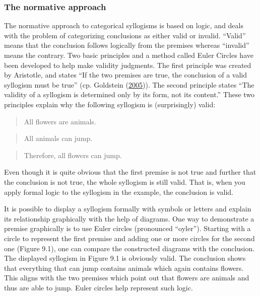\documentclass[
]{krantz}
\begin{document}
\hypertarget{the-normative-approach}{%
\subsubsection*{The normative approach}\label{the-normative-approach}}


The normative approach to categorical syllogisms is based on logic, and deals with the problem of categorizing conclusions as either valid or invalid. ``Valid'' means that the conclusion follows logically from the premises whereas ``invalid'' means the contrary. Two basic principles and a method called Euler Circles have been developed to help make validity judgments. The first principle was created by Aristotle, and states ``If the two premises are true, the conclusion of a valid syllogism must be true'' (cp. Goldstein (\protect\hyperlink{ref-Goldstein2005}{2005})). The second principle states ``The validity of a syllogism is determined only by its form, not its content.'' These two principles explain why the following syllogism is (surprisingly) valid:

\begin{quote}
All flowers are animals.
\end{quote}

\begin{quote}
All animals can jump.
\end{quote}

\begin{quote}
Therefore, all flowers can jump.
\end{quote}

Even though it is quite obvious that the first premise is not true and further that the conclusion is not true, the whole syllogism is still valid. That is, when you apply formal logic to the syllogism in the example, the conclusion is valid.

It is possible to display a syllogism formally with symbols or letters and explain its relationship graphically with the help of diagrams. One way to demonstrate a premise graphically is to use Euler circles (pronounced ``oyler''). Starting with a circle to represent the first premise and adding one or more circles for the second one (Figure 9.1), one can compare the constructed diagrams with the conclusion. The displayed syllogism in Figure 9.1 is obviously valid. The conclusion shows that everything that can jump contains animals which again contains flowers. This aligns with the two premises which point out that flowers are animals and thus are able to jump. Euler circles help represent such logic.
\end{document}

